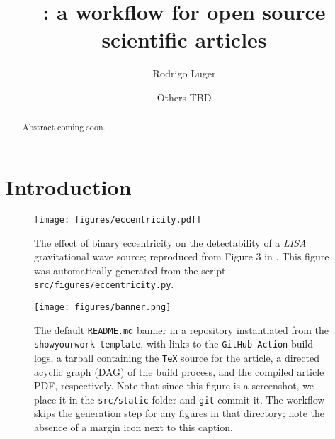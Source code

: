 \documentclass[twocolumn]{aastex631}
\begin{document}
\title{\showyourwork: a workflow for open source scientific articles}

\author[0000-0002-0296-3826]{Rodrigo Luger}
\author{Others TBD}

\begin{abstract}
    Abstract coming soon.
\end{abstract}

\section{Introduction}
\label{sec:intro}

\begin{figure}[ht!]
    \begin{centering}
        \texttt{[image: figures/eccentricity.pdf]}
        \caption{
            The effect of binary eccentricity on the detectability of a \emph{LISA} gravitational wave source; reproduced from Figure 3 in \citet{Wagg2021}. 
            This figure was automatically generated from the script \texttt{src/figures/eccentricity.py}.
        }
        \label{fig:eccentricity}
    \end{centering}
\end{figure}

\begin{figure}[th!]
    \begin{centering}
        \texttt{[image: figures/banner.png]}
        \caption{
            The default \texttt{README.md} banner in a repository instantiated from the \texttt{showyourwork-template}, with links to the \texttt{GitHub Action} build logs, a tarball containing the \texttt{TeX} source for the article, a directed acyclic graph (DAG) of the build process, and the compiled article PDF, respectively.
            Note that since this figure is a screenshot, we place it in the \texttt{src/static} folder and \texttt{git}-commit it.
            The workflow skips the generation step for any figures in that directory; note the absence of a margin icon next to this caption.
        }
        \label{fig:banner}
    \end{centering}
\end{figure}


\end{document}
